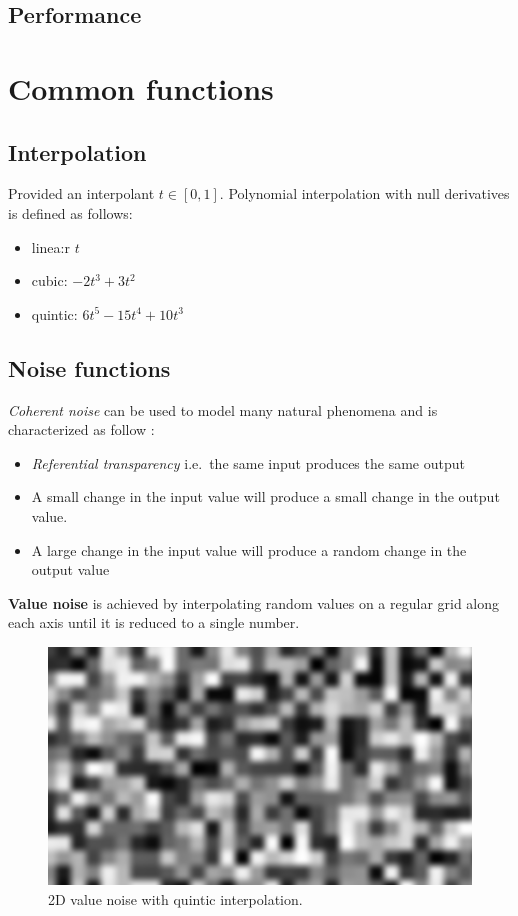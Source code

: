 \documentclass[a4paper]{article}
\begin{document}
\subsection{Performance}

\section{Common functions}

\subsection{Interpolation}

Provided an interpolant $t \in [0, 1]$.
Polynomial interpolation with null derivatives is defined as follows:
\begin{itemize}
\item linea:r $t$
\item cubic: $-2t^3 + 3t^2$
\item quintic: $6t^5 - 15t^4 + 10t^3$
\end{itemize}

\subsection{Noise functions}

\textit{Coherent noise} can be used to model many natural phenomena and is characterized as follow \cite{libnoise_coherent_noise}:
\begin{itemize}
\item \textit{Referential transparency} i.e.\ the same input produces the same output
\item A small change in the input value will produce a small change in the output value.
\item A large change in the input value will produce a random change in the output value
\end{itemize}

\textbf{Value noise} is achieved by interpolating random values on a regular grid along each axis until it is reduced to a single number.

\begin{figure}[h]
\includegraphics[width=\linewidth]{img/value_noise_2d}
\caption{2D value noise with quintic interpolation.}
\end{figure}
\end{document}
